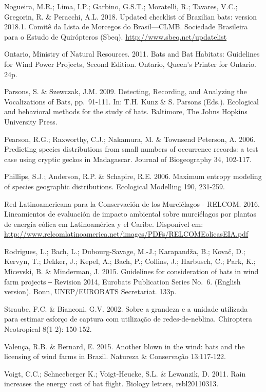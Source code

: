 \documentclass[
  oneside]{scrbook}
\begin{document}
Nogueira, M.R.; Lima, I.P.; Garbino, G.S.T.; Moratelli, R.; Tavares, V.C.; Gregorin, R. \& Peracchi, A.L. 2018. Updated checklist of Brazilian bats: version 2018.1. Comitê da Lista de Morcegos do Brasil---CLMB. Sociedade Brasileira para o Estudo de Quirópteros (Sbeq). \url{http://www.sbeq.net/updatelist}

Ontario, Ministry of Natural Resources. 2011. Bats and Bat Habitats: Guidelines for Wind Power Projects, Second Edition. Ontario, Queen's Printer for Ontario. 24p.

Parsons, S. \& Szewczak, J.M. 2009. Detecting, Recording, and Analyzing the Vocalizations of Bats, pp.~91-111. In: T.H. Kunz \& S. Parsons (Eds.). Ecological and behavioral methods for the study of bats. Baltimore, The Johns Hopkins University Press.

Pearson, R.G.; Raxworthy, C.J.; Nakamura, M. \& Townsend Peterson, A. 2006. Predicting species distributions from small numbers of occurrence records: a test case using cryptic geckos in Madagascar. Journal of Biogeography 34, 102-117.

Phillips, S.J.; Anderson, R.P. \& Schapire, R.E. 2006. Maximum entropy modeling of species geographic distributions. Ecological Modelling 190, 231-259.

Red Latinoamericana para la Conservación de los Murciélagos - RELCOM. 2016. Lineamientos de evaluación de impacto ambiental sobre murciélagos por plantas de energía eólica em Latinoamérica y el Caribe. Disponível em: \url{http://www.relcomlatinoamerica.net/images/PDFs/RELCOMEolicasEIA.pdf}

Rodrigues, L.; Bach, L.; Dubourg-Savage, M.-J.; Karapandža, B.; Kovač, D.; Kervyn, T.; Dekker, J.; Kepel, A.; Bach, P.; Collins, J.; Harbusch, C.; Park, K.; Micevski, B. \& Minderman, J. 2015. Guidelines for consideration of bats in wind farm projects ‒ Revision 2014, Eurobats Publication Series No.~6. (English version). Bonn, UNEP/EUROBATS Secretariat. 133p.

Straube, F.C. \& Bianconi, G.V. 2002. Sobre a grandeza e a unidade utilizada para estimar esforço de captura com utilização de redes-de-neblina. Chiroptera Neotropical 8(1-2): 150-152.

Valença, R.B. \& Bernard, E. 2015. Another blown in the wind: bats and the licensing of wind farms in Brazil. Natureza \& Conservação 13:117-122.

Voigt, C.C.; Schneeberger K.; Voigt-Heucke, S.L. \& Lewanzik, D. 2011. Rain increases the energy cost of bat flight. Biology letters, rsbl20110313.
\end{document}
